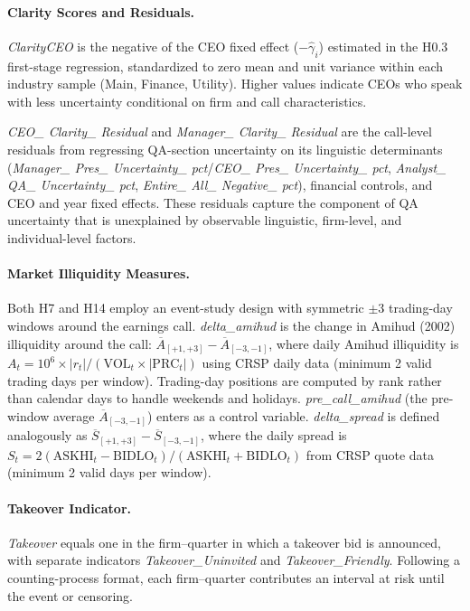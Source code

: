 \documentclass[12pt,a4paper]{article}
\begin{document}
\paragraph{Clarity Scores and Residuals.}
\textit{ClarityCEO} is the negative of the CEO fixed effect ($-\hat{\gamma}_i$) estimated in the H0.3 first-stage regression, standardized to zero mean and unit variance within each industry sample (Main, Finance, Utility). Higher values indicate CEOs who speak with less uncertainty conditional on firm and call characteristics.

\textit{CEO\_ Clarity\_ Residual} and \textit{Manager\_ Clarity\_ Residual} are the call-level residuals from regressing QA-section uncertainty on its linguistic determinants (\textit{Manager\_ Pres\_ Uncertainty\_ pct}/\textit{CEO\_ Pres\_ Uncertainty\_ pct}, \textit{Analyst\_ QA\_ Uncertainty\_ pct}, \textit{Entire\_ All\_ Negative\_ pct}), financial controls, and CEO and year fixed effects. These residuals capture the component of QA uncertainty that is unexplained by observable linguistic, firm-level, and individual-level factors.

\paragraph{Market Illiquidity Measures.}
Both H7 and H14 employ an event-study design with symmetric $\pm$3 trading-day windows around the earnings call. \textit{delta\_amihud} is the change in Amihud (2002) illiquidity around the call: $\overline{A}_{[+1,+3]} - \overline{A}_{[-3,-1]}$, where daily Amihud illiquidity is $A_t = 10^6 \times |r_t| / (\text{VOL}_t \times |\text{PRC}_t|)$ using CRSP daily data (minimum 2 valid trading days per window). Trading-day positions are computed by rank rather than calendar days to handle weekends and holidays. \textit{pre\_call\_amihud} (the pre-window average $\overline{A}_{[-3,-1]}$) enters as a control variable. \textit{delta\_spread} is defined analogously as $\overline{S}_{[+1,+3]} - \overline{S}_{[-3,-1]}$, where the daily spread is $S_t = 2(\text{ASKHI}_t - \text{BIDLO}_t) / (\text{ASKHI}_t + \text{BIDLO}_t)$ from CRSP quote data (minimum 2 valid days per window).

\paragraph{Takeover Indicator.}
\textit{Takeover} equals one in the firm--quarter in which a takeover bid is announced, with separate indicators \textit{Takeover\_Uninvited} and \textit{Takeover\_Friendly}. Following a counting-process format, each firm--quarter contributes an interval at risk until the event or censoring.
\end{document}
